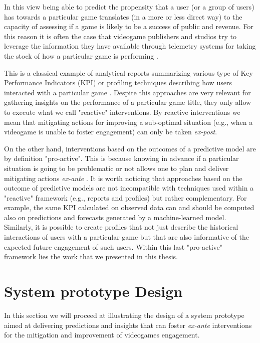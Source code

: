 In this view being able to predict the propensity that a user (or a group of users) has towards a particular game translates (in a more or less direct way) to the capacity of assessing if a game is likely to be a success of public and revenue. For this reason it is often the case that videogame publishers and studios try to leverage the information they have available through telemetry systems for taking the stock of how a particular game is performing \cite{el2016game}. 

This is a classical example of analytical reports summarizing various type of Key Performance Indicators (KPI)\cite{el2016game} or profiling techniques describing how users interacted with a particular game \cite{el2016game}. Despite this approaches are very relevant for gathering insights on the performance of a particular game title, they only allow to execute what we call "reactive" interventions. By reactive interventions we mean that mitigating actions for improving a sub-optimal situation (e.g., when a videogame is unable to foster engagement) can only be taken \textit{ex-post}.

On the other hand, interventions based on the outcomes of a predictive model are by definition "pro-active". This is because knowing in advance if a particular situation is going to be problematic or not allows one to plan and deliver mitigating actions \textit{ex-ante} \cite{el2016game, el2021game}. It is worth noticing that approaches based on the outcome of predictive models are not incompatible with techniques used within a "reactive" framework (e.g., reports and profiles) but rather complementary. For example, the same KPI calculated on observed data can and should be computed also on predictions and forecasts generated by a machine-learned model. Similarly, it is possible to create profiles that not just describe the historical interactions of users with a particular game but that are also informative of the expected future engagement of such users. Within this last "pro-active" framework lies the work that we presented in this thesis. 

\section{System prototype Design}
\label{system_proto_design}

In this section we will proceed at illustrating the design of a system prototype aimed at delivering predictions and insights that can foster \textit{ex-ante} interventions for the mitigation and improvement of videogames engagement. 

